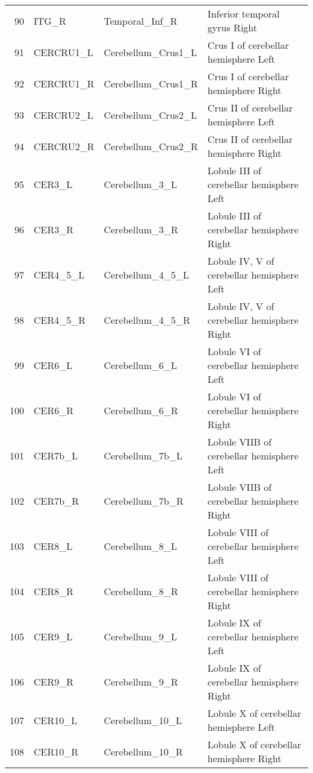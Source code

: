 \documentclass[12pt,reqno]{amsart}
\theoremstyle{definition}
\begin{document}
\begin{longtable}{rlll}
 90 &       ITG\_R &       Temporal\_Inf\_R &                      Inferior temporal gyrus Right \\
 91 &   CERCRU1\_L &   Cerebellum\_Crus1\_L &               Crus I of cerebellar hemisphere Left \\
 92 &   CERCRU1\_R &   Cerebellum\_Crus1\_R &              Crus I of cerebellar hemisphere Right \\
 93 &   CERCRU2\_L &   Cerebellum\_Crus2\_L &              Crus II of cerebellar hemisphere Left \\
 94 &   CERCRU2\_R &   Cerebellum\_Crus2\_R &             Crus II of cerebellar hemisphere Right \\
 95 &      CER3\_L &       Cerebellum\_3\_L &           Lobule III of cerebellar hemisphere Left \\
 96 &      CER3\_R &       Cerebellum\_3\_R &          Lobule III of cerebellar hemisphere Right \\
 97 &    CER4\_5\_L &     Cerebellum\_4\_5\_L &         Lobule IV, V of cerebellar hemisphere Left \\
 98 &    CER4\_5\_R &     Cerebellum\_4\_5\_R &        Lobule IV, V of cerebellar hemisphere Right \\
 99 &      CER6\_L &       Cerebellum\_6\_L &            Lobule VI of cerebellar hemisphere Left \\
100 &      CER6\_R &       Cerebellum\_6\_R &           Lobule VI of cerebellar hemisphere Right \\
101 &     CER7b\_L &      Cerebellum\_7b\_L &          Lobule VIIB of cerebellar hemisphere Left \\
102 &     CER7b\_R &      Cerebellum\_7b\_R &         Lobule VIIB of cerebellar hemisphere Right \\
103 &      CER8\_L &       Cerebellum\_8\_L &          Lobule VIII of cerebellar hemisphere Left \\
104 &      CER8\_R &       Cerebellum\_8\_R &         Lobule VIII of cerebellar hemisphere Right \\
105 &      CER9\_L &       Cerebellum\_9\_L &            Lobule IX of cerebellar hemisphere Left \\
106 &      CER9\_R &       Cerebellum\_9\_R &           Lobule IX of cerebellar hemisphere Right \\
107 &     CER10\_L &      Cerebellum\_10\_L &             Lobule X of cerebellar hemisphere Left \\
108 &     CER10\_R &      Cerebellum\_10\_R &            Lobule X of cerebellar hemisphere Right \\

\end{longtable}
\end{document}
